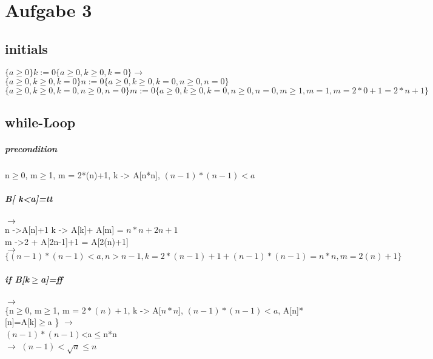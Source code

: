 \documentclass[10pt,a4paper]{article}
\begin{document}
\pagebreak
\section{Aufgabe 3} 

\subsection{initials}
$ \{a \ge 0 \} k:= 0 \{a \ge 0, k \ge 0, k = 0 \} \rightarrow$ \newline 
$ \{a \ge 0, k \ge 0, k =0 \} n:=0 \{a \ge 0, k \ge 0, k =0 , n\ge 0 , n = 0\}$ \newline
 $\{a \ge 0, k \ge 0, k =0 , n\ge 0 , n = 0\} m := 0 \{a \ge 0, k \ge 0, k =0 , n\ge 0 , n = 0, m \ge 1, m = 1 , m = 2 * 0 +1 = 2 * n +1 \}$
 \newline
 
\subsection{while-Loop}
\subparagraph{precondition}
{n$\ge$0, m$\ge$1, m = 2*(n)+1, k -> A[n*n], $(n-1)*(n-1)<a$ }

 \subparagraph{B[ k<a]=tt} $\rightarrow$
 \\
   n ->A[n]+1
   k -> A[k]+ A[m] = $n*n+  2n+1$ \\
   m ->2 + A[2n-1]+1 = A[2(n)+1]\\
$\rightarrow$
$\{(n-1)*(n-1)<a, n>n-1, k=2*(n-1)+1+(n-1)*(n-1) = n*n, m= 2(n)+1 \}$

\subparagraph{if B[k$\ge$a]=ff}
$\rightarrow $ \\
\{n$\ge$0, m$\ge$1, m = $2*(n)+1$, k -> A[$n*n$], $(n-1)*(n-1)<a$, A[n]*[n]=A[k]$\ge$a \}
$\rightarrow$  \\$(n-1)*(n-1)$<a$\le$n*n \\ $\rightarrow$ $(n-1)<\sqrt{a}\le n$
	
	
\end{document}
